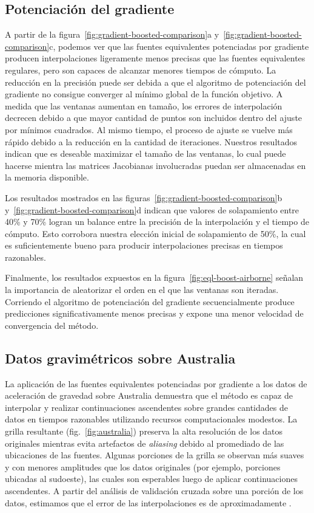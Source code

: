 \subsection{Potenciación del gradiente}

A partir de la figura~\ref{fig:gradient-boosted-comparison}a
y~\ref{fig:gradient-boosted-comparison}c,
podemos ver que las fuentes equivalentes potenciadas por gradiente producen
interpolaciones ligeramente menos precisas que las fuentes equivalentes
regulares, pero son capaces de alcanzar menores tiempos de cómputo.
La reducción en la precisión puede ser debida a que el algoritmo de
potenciación del gradiente no consigue converger al mínimo global de la función
objetivo.
A medida que las ventanas aumentan en tamaño, los errores de interpolación
decrecen debido a que mayor cantidad de puntos son incluidos dentro del ajuste
por mínimos cuadrados.
Al mismo tiempo, el proceso de ajuste se vuelve más rápido debido a la
reducción en la cantidad de iteraciones.
Nuestros resultados indican que es deseable maximizar el tamaño de las
ventanas, lo cual puede hacerse mientra las matrices Jacobianas involucradas
puedan ser almacenadas en la memoria disponible.

Los resultados mostrados en las figuras~\ref{fig:gradient-boosted-comparison}b
y~\ref{fig:gradient-boosted-comparison}d
indican que valores de solapamiento entre 40\% y 70\% logran un balance entre
la precisión de la interpolación y el tiempo de cómputo.
Esto corrobora nuestra elección inicial de solapamiento de 50\%, la cual es
suficientemente bueno para producir interpolaciones precisas en tiempos
razonables.

Finalmente, los resultados expuestos en la figura~\ref{fig:eql-boost-airborne}
señalan la importancia de aleatorizar el orden en el que las ventanas son
iteradas.
Corriendo el algoritmo de potenciación del gradiente secuencialmente produce
predicciones significativamente menos precisas y expone una menor velocidad de
convergencia del método.

\subsection{Datos gravimétricos sobre Australia}

La aplicación de las fuentes equivalentes potenciadas por gradiente a los datos
de aceleración de gravedad sobre Australia demuestra que el método es capaz de
interpolar y realizar continuaciones ascendentes sobre grandes cantidades de
datos en tiempos razonables utilizando recursos computacionales modestos.
La grilla resultante (fig.~\ref{fig:australia}) preserva la alta resolución de
los datos originales mientras evita artefactos de \emph{aliasing} debido al
promediado de las ubicaciones de las fuentes.
Algunas porciones de la grilla se observan más suaves y con menores amplitudes
que los datos originales (por ejemplo, porciones ubicadas al sudoeste), las
cuales son esperables luego de aplicar continuaciones ascendentes.
A partir del análisis de validación cruzada sobre una porción de los datos,
estimamos que el error de las interpolaciones es de aproximadamente
\AustraliaEqlRmsScore{}.

